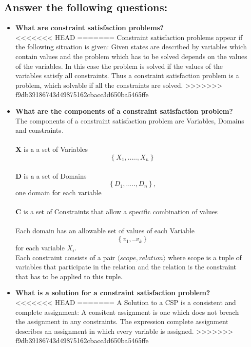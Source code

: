 \documentclass[11pt]{article}
\begin{document}
\subsection{Answer the following questions:}
	\begin{itemize}
		\item\textbf{What are constraint satisfaction problems?}\\
<<<<<<< HEAD
=======
		Constraint satisfaction problems appear if the following situation is given: Given states are described by variables which contain values and the problem which has to be solved depends on the values of the variables. In this case the problem is solved if the values of the variables satisfy all constraints. Thus a constraint satisfaction problem is a problem, which solvable if all the constraints are solved.
>>>>>>> f9db39186743d49875162cbacc3d650ba5465ffe
		
		\item\textbf{What are the components of a constraint satisfaction problem?}\\
		The components of a constraint satisfaction problem are Variables, Domains and constraints. \\\\
		\textbf X is a a set of Variables $$\left\{X_1,.....,X_n\right\}$$\\
		\textbf D is a a set of Domains $$\left\{D_1,.....,D_n\right\},$$ one domain for each variable\\\\
		\textbf C is a set of Constraints that allow a specific combination of values\\\\
		Each domain has an allowable set of values of each Variable $$\left\{v_1,..v_k\right\}$$ for each variable $X_i$.\\
		Each constraint consists of a pair $\langle scope, relation \rangle$ where scope is a tuple of variables that participate in the relation and the relation is the constraint that has to be applied to this tuple.
		
		\item\textbf{What is a solution for a constraint satisfaction problem?}\\
<<<<<<< HEAD
=======
		A Solution to a CSP is a consistent and complete assignment: A consitent assignment is one which does not breach the assignment in any constraints. The expression complete assignment describes an assignment in which every variable is assigned.
>>>>>>> f9db39186743d49875162cbacc3d650ba5465ffe
		

\end{itemize}
\end{document}
